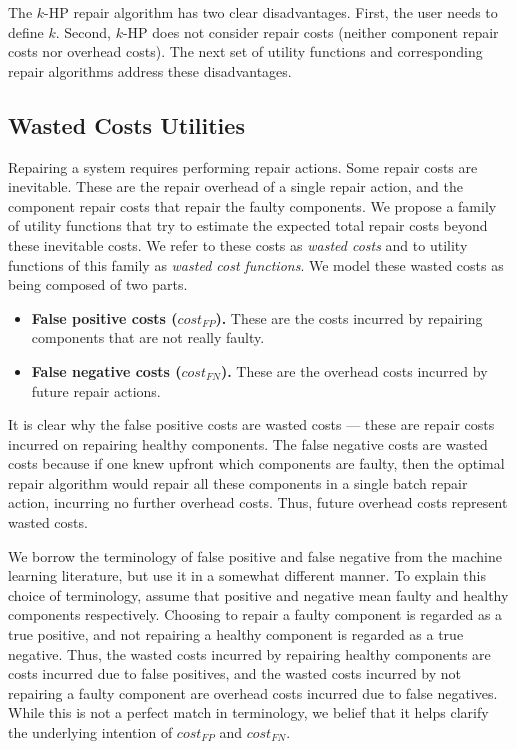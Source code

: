 \documentclass[letterpaper]{article}
\begin{document}
The $k$-HP repair algorithm has two clear disadvantages. First, the user needs to define $k$. Second, $k$-HP does not consider repair costs (neither component repair costs nor overhead costs).
The next set of utility functions and corresponding repair algorithms address these disadvantages.



\subsection{Wasted Costs Utilities}

Repairing a system requires performing repair actions. %
Some repair costs are inevitable. These are the repair overhead of a single repair action, and the component repair costs that repair the faulty components. We propose a family of utility functions that try to estimate the expected total repair costs beyond these inevitable costs. We refer to these costs as {\em wasted costs} and to utility functions of this family as {\em wasted cost functions}. We model these wasted costs as being composed of two parts.
\begin{itemize}
\item {\bf False positive costs ($cost_{FP}$).} These are the costs incurred by repairing components that are not really faulty.
\item {\bf False negative costs ($cost_{FN}$).} These are the overhead costs incurred by future repair actions.
\end{itemize}
It is clear why the false positive costs are wasted costs --- these are repair costs incurred on repairing healthy components. The false negative costs are wasted costs because if one knew upfront which components are faulty, then the optimal repair algorithm would repair all these components in a single batch repair action, incurring no further overhead costs. Thus, future overhead costs represent wasted costs.


We borrow the terminology of false positive and false negative from the machine learning literature, but use it in a somewhat different manner. To explain this choice of terminology, assume that positive and negative mean faulty and healthy components respectively. Choosing to repair a faulty component is regarded as a true positive, and not repairing a healthy component is regarded as a true negative. Thus, the wasted costs incurred by repairing healthy components are costs incurred due to false positives, and the wasted costs incurred by not repairing a faulty component are overhead costs incurred due to false negatives. While this is not a perfect match in terminology, we belief that it helps clarify the underlying intention of $cost_{FP}$ and $cost_{FN}$.
\end{document}
